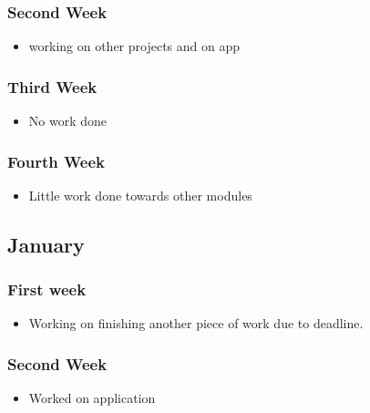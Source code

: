 \subsubsection*{Second Week}\label{second-week-2}

\begin{itemize}
\tightlist
\item
  working on other projects and on app
\end{itemize}

\subsubsection*{Third Week}\label{third-week-1}

\begin{itemize}
\tightlist
\item
  No work done
\end{itemize}

\subsubsection*{Fourth Week}\label{fourth-week-1}

\begin{itemize}
\tightlist
\item
  Little work done towards other modules
\end{itemize}

\subsection{January}\label{january}

\subsubsection*{First week}\label{first-week-3}

\begin{itemize}
\tightlist
\item
  Working on finishing another piece of work due to deadline.
\end{itemize}

\subsubsection*{Second Week}\label{second-week-3}

\begin{itemize}
\tightlist
\item
  Worked on application
\end{itemize}


